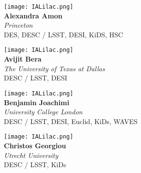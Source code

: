\documentclass[12pt,letterpaper]{article}
\begin{document}
\begin{multicols}{2}

    \begin{minipage}[t][2in][c]{.45\textwidth}
    \centering
    \texttt{[image: IALilac.png]}\\ \vspace{.5cm}
    \Huge \textbf{Alexandra Amon}\\
    \vspace{0.5cm}
    \Large \textit{Princeton} \\
    \vspace{0.5cm}
    \small DES, DESC / LSST, DESI, KiDS, HSC
    \end{minipage}
    \vspace{1cm}
    
    \begin{minipage}[t][2in][c]{.45\textwidth}
    \centering
    \texttt{[image: IALilac.png]}\\ \vspace{.5cm}
    \Huge \textbf{Avijit Bera}\\
    \vspace{0.5cm}
    \Large \textit{The University of Texas at Dallas} \\
    \vspace{0.5cm}
    \small DESC / LSST, DESI
    \end{minipage}
    \vspace{1cm}
    
    \begin{minipage}[t][2in][c]{.45\textwidth}
    \centering
    \texttt{[image: IALilac.png]}\\ \vspace{.5cm}
    \huge \textbf{Benjamin Joachimi}\\
    \vspace{0.5cm}
    \Large \textit{University College London} \\
    \vspace{0.5cm}
    \small DESC / LSST, DESI, Euclid, KiDs, WAVES
    \end{minipage}
    \vspace{1cm}
    
    \begin{minipage}[t][2in][c]{.45\textwidth}
    \centering
    \texttt{[image: IALilac.png]}\\ \vspace{.5cm}
    \huge \textbf{Christos Georgiou}\\
    \vspace{0.5cm}
    \Large \textit{Utrecht University} \\
    \vspace{0.5cm}
    \small DESC / LSST, KiDs
    \end{minipage}
    \vspace{1cm}
    

\end{multicols}
\end{document}
